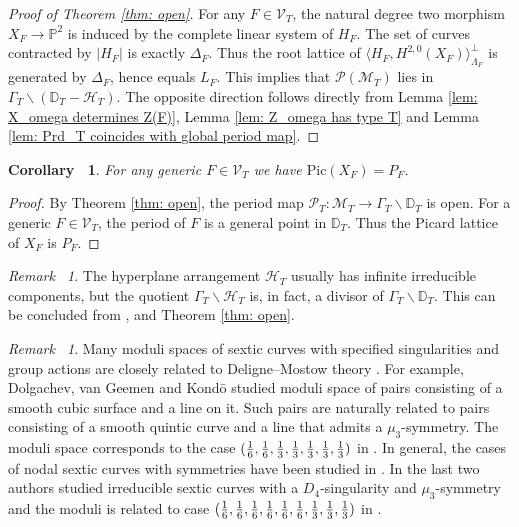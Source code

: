 \documentclass[12pt,reqno,a4paper]{amsart}
\newtheorem{cor}[thm]{Corollary~}
\theoremstyle{remark}
\newtheorem{rmk}[thm]{Remark~}
\theoremstyle{definition}
\begin{document}
\begin{proof}[Proof of Theorem \ref{thm: open}] 
    For any $F\in\mathcal{V}_T$, the natural degree two morphism $X_F\to\mathbb{P}^2$ is induced by the complete linear system of $H_F$.
    The set of curves contracted by $|H_F|$ is exactly $\Delta_F$.
    Thus the root lattice of $\langle H_F,H^{2,0}(X_F) \rangle^\perp_{\Lambda_F}$ is generated by $\Delta_F$, hence equals $L_F$.
    This implies that $\mathscr{P}(\mathcal{M}_T)$ lies in $\Gamma_T\backslash(\mathbb{D}_T-\mathcal{H}_T)$.
    The opposite direction follows directly from Lemma \ref{lem: X_omega determines Z(F)}, Lemma \ref{lem: Z_omega has type T} and Lemma \ref{lem: Prd_T coincides with global period map}.
\end{proof}


\begin{cor}
\label{cor: generic Picard}
For any generic $F\in\mathcal{V}_T$ we have $\mathrm{Pic}(X_F)=P_F$.
\end{cor}
\begin{proof}
By Theorem \ref{thm: open}, the period map $\mathscr{P}_T \colon\mathcal{M}_T\to \Gamma_T\backslash \mathbb{D}_T$ is open. For a generic $F\in \mathcal{V}_T$, the period of $F$ is a general point in $\mathbb{D}_T$. Thus the Picard lattice of $X_F$ is $P_F$.
\end{proof}

\begin{rmk}
    The hyperplane arrangement $\mathcal{H}_T$ usually has infinite irreducible components, but the quotient $\Gamma_T\backslash\mathcal{H}_T$ is, in fact, a divisor of $\Gamma_T\backslash\mathbb{D}_T$.
    This can be concluded from \cite{baily1966compactification}, \cite{borel1972metric} and Theorem \ref{thm: open}.
\end{rmk}

\begin{rmk}
Many moduli spaces of sextic curves with specified singularities and group actions are closely related to Deligne--Mostow theory \cite{deligne1986monodromy}. For example, Dolgachev, van Geemen and Kond\=o \cite{dolgachev2005complex} studied moduli space of pairs consisting of a smooth cubic surface and a line on it. Such pairs are naturally related to pairs consisting of a smooth quintic curve and a line that admits a $\mu_3$-symmetry. The moduli space corresponds to
the case $({1\over 6}, {1\over 6}, {1\over 3}, {1\over 3}, {1\over 3}, {1\over 3}, {1\over 3})$ in \cite{mostow1988discontinuous}. In general, the cases of nodal sextic curves with symmetries have been studied in \cite[\S 5]{yu2023moduli}. In \cite{zheng2024complex} the last two authors studied irreducible sextic curves with a $D_4$-singularity and $\mu_3$-symmetry and the moduli is related to case $({1\over 6}, {1\over 6}, {1\over 6}, {1\over 6}, {1\over 6}, {1\over 6}, {1\over 3}, {1\over 3}, {1\over 3})$ in \cite{mostow1988discontinuous}. 
\end{rmk}
\end{document}
